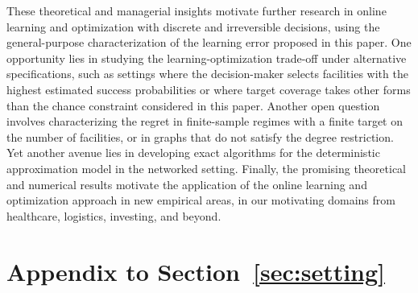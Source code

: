 \documentclass[blindrev]{informs3noheader}
\begin{document}
These theoretical and managerial insights motivate further research in online learning and optimization with discrete and irreversible decisions, using the general-purpose characterization of the learning error proposed in this paper. One opportunity lies in studying the learning-optimization trade-off under alternative specifications, such as settings where the decision-maker selects facilities with the highest estimated success probabilities or where target coverage takes other forms than the chance constraint considered in this paper. Another open question involves characterizing the regret in finite-sample regimes with a finite target on the number of facilities, or in graphs that do not satisfy the degree restriction. Yet another avenue lies in developing exact algorithms for the deterministic approximation model in the networked setting. Finally, the promising theoretical and numerical results motivate the application of the online learning and optimization approach in new empirical areas, in our motivating domains from healthcare, logistics, investing, and beyond.




\newpage

\ECSwitch
{}

\section{Appendix to Section~\ref{sec:setting}}
\label{app:stats}
\end{document}
